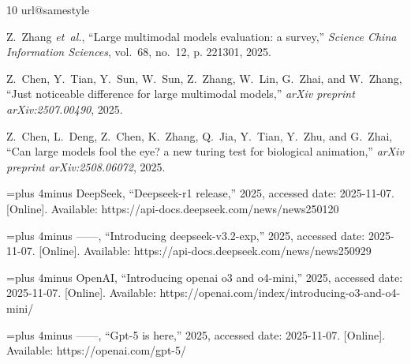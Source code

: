 \documentclass[conference]{IEEEtran}
\begin{document}
\begin{thebibliography}{10}
\providecommand{\url}[1]{#1}
\csname url@samestyle\endcsname
\providecommand{\newblock}{\relax}
\providecommand{\bibinfo}[2]{#2}
\providecommand{\BIBentrySTDinterwordspacing}{\spaceskip=0pt\relax}
\providecommand{\BIBentryALTinterwordstretchfactor}{4}
\providecommand{\BIBentryALTinterwordspacing}{\spaceskip=\fontdimen2\font plus
\BIBentryALTinterwordstretchfactor\fontdimen3\font minus \fontdimen4\font\relax}
\providecommand{\BIBforeignlanguage}[2]{{%
\expandafter\ifx\csname l@#1\endcsname\relax
\typeout{** WARNING: IEEEtran.bst: No hyphenation pattern has been}%
\typeout{** loaded for the language `#1'. Using the pattern for}%
\typeout{** the default language instead.}%
\else
\language=\csname l@#1\endcsname
\fi
#2}}
\providecommand{\BIBdecl}{\relax}
\BIBdecl

Z.~Zhang \emph{et~al.}, ``Large multimodal models evaluation: a survey,'' \emph{Science China Information Sciences}, vol.~68, no.~12, p. 221301, 2025.

Z.~Chen, Y.~Tian, Y.~Sun, W.~Sun, Z.~Zhang, W.~Lin, G.~Zhai, and W.~Zhang, ``Just noticeable difference for large multimodal models,'' \emph{arXiv preprint arXiv:2507.00490}, 2025.

Z.~Chen, L.~Deng, Z.~Chen, K.~Zhang, Q.~Jia, Y.~Tian, Y.~Zhu, and G.~Zhai, ``Can large models fool the eye? a new turing test for biological animation,'' \emph{arXiv preprint arXiv:2508.06072}, 2025.

\BIBentryALTinterwordspacing
DeepSeek, ``Deepseek-r1 release,'' 2025, accessed date: 2025-11-07. [Online]. Available: \url{https://api-docs.deepseek.com/news/news250120}
\BIBentrySTDinterwordspacing

\BIBentryALTinterwordspacing
------, ``Introducing deepseek-v3.2-exp,'' 2025, accessed date: 2025-11-07. [Online]. Available: \url{https://api-docs.deepseek.com/news/news250929}
\BIBentrySTDinterwordspacing

\BIBentryALTinterwordspacing
OpenAI, ``Introducing openai o3 and o4-mini,'' 2025, accessed date: 2025-11-07. [Online]. Available: \url{https://openai.com/index/introducing-o3-and-o4-mini/}
\BIBentrySTDinterwordspacing

\BIBentryALTinterwordspacing
------, ``Gpt-5 is here,'' 2025, accessed date: 2025-11-07. [Online]. Available: \url{https://openai.com/gpt-5/}
\BIBentrySTDinterwordspacing


\end{thebibliography}
\end{document}
